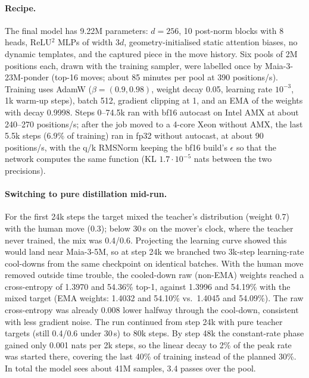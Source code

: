 \paragraph{Recipe.} The final model has 9.22M parameters: $d=256$, 10 post-norm blocks with 8 heads,
ReLU$^2$ MLPs of width $3d$, geometry-initialised static attention biases, no dynamic templates, and the
captured piece in the move history. Six pools of 2M positions each, drawn with the training sampler,
were labelled once by Maia-3-23M-ponder (top-16 moves; about 85 minutes per pool at 390
positions/s). Training uses AdamW ($\beta=(0.9, 0.98)$, weight decay 0.05, learning rate $10^{-3}$,
1k warm-up steps), batch 512, gradient clipping at 1, and an EMA of the weights with decay 0.9998.
Steps 0--74.5k ran with bf16 autocast on Intel AMX at about 240--270 positions/s; after the job moved
to a 4-core Xeon without AMX, the last 5.5k steps (6.9\% of training) ran in fp32 without autocast,
at about 90 positions/s, with the q/k RMSNorm keeping the bf16 build's $\epsilon$ so that the network
computes the same function (KL $1.7\cdot10^{-5}$ nats between the two precisions).

\paragraph{Switching to pure distillation mid-run.} For the first 24k steps the target mixed the
teacher's distribution (weight 0.7) with the human move (0.3); below 30\,s on the mover's clock,
where the teacher never trained, the mix was 0.4/0.6. Projecting the learning curve showed this
would land near Maia-3-5M, so at step 24k we branched two 3k-step learning-rate cool-downs from
the same checkpoint on identical batches. With the human move removed outside time trouble, the
cooled-down raw (non-EMA) weights reached a cross-entropy of 1.3970 and 54.36\% top-1, against
1.3996 and 54.19\% with the mixed target (EMA weights: 1.4032 and 54.10\% vs.\ 1.4045 and 54.09\%).
The raw cross-entropy was already 0.008 lower halfway through the cool-down, consistent with less
gradient noise. The run continued from step 24k with pure teacher
targets (still 0.4/0.6 under 30\,s) to 80k steps. By step 48k the constant-rate phase gained only
0.001 nats per 2k steps, so the linear decay to 2\% of the peak rate was started there, covering the
last 40\% of training instead of the planned 30\%. In total the model sees about 41M samples, 3.4 passes over the pool.

